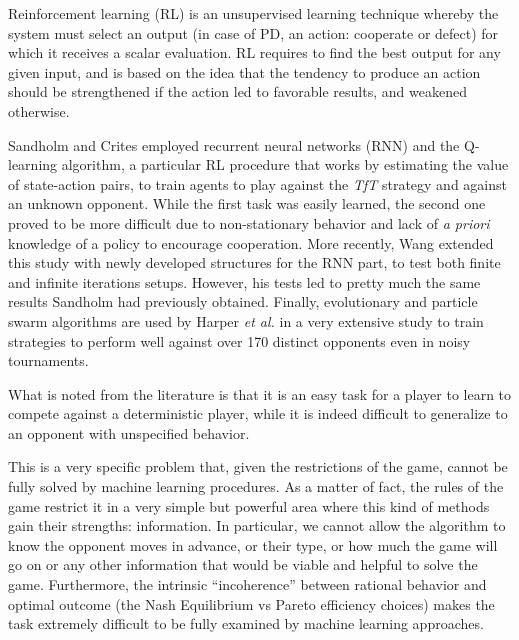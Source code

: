 \documentclass[journal,10pt,twoside]{IEEEtran}
\begin{document}
Reinforcement learning (RL) is an unsupervised learning technique whereby the system must select an output (in case of PD, an action: cooperate or defect) for which it receives a scalar evaluation. RL requires to find the best output for any given input, and is based on the idea that the tendency to produce an action should be strengthened if the action led to favorable results, and weakened otherwise.~\cite{sandholmRL}

Sandholm and Crites \cite{sandholmRL} employed recurrent neural networks (RNN) and the Q-learning algorithm, a particular RL procedure that works by estimating the value of state-action pairs, to train agents to play against the \textit{TfT} strategy and against an unknown opponent. While the first task was easily learned, the second one proved to be more difficult due to non-stationary behavior and lack of \textit{a priori} knowledge of a policy to encourage cooperation.
More recently, Wang \cite{kedaoRL} extended this study with newly developed structures for the RNN part, to test both finite and infinite iterations setups. However, his tests led to pretty much the same results Sandholm had previously obtained.
Finally, evolutionary and particle swarm algorithms are used by Harper \textit{et al.} in a very extensive study \cite{plosRLdominant} to train strategies to perform well against over 170 distinct opponents even in noisy tournaments.

What is noted from the literature is that it is an easy task for a player to learn to compete against a deterministic player, while it is indeed difficult to generalize to an opponent with unspecified behavior.

This is a very specific problem that, given the restrictions of the game, cannot be fully solved by machine learning procedures. As a matter of fact, the rules of the game restrict it in a very simple but powerful area where this kind of methods gain their strengths: information. In particular, we cannot allow the algorithm to know the opponent moves in advance, or their type, or how much the game will go on or any other information that would be viable and helpful to solve the game. Furthermore, the intrinsic ``incoherence'' between rational behavior and optimal outcome (the Nash Equilibrium vs Pareto efficiency choices) makes the task extremely difficult to be fully examined by machine learning approaches.
\end{document}
